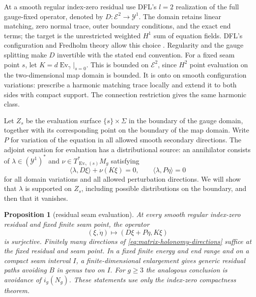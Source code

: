 \documentclass[11pt]{amsart}
\newtheorem{proposition}[theorem]{Proposition}
\theoremstyle{definition}
\theoremstyle{remark}
\theoremstyle{plain}
\newcommand{\Ev}{\operatorname{Ev}}
\begin{document}
At a smooth regular index-zero residual use DFL's $l=2$ realization
of the full gauge-fixed operator, denoted by
$D:\mathcal E^2\to\mathcal Y^1$. The domain retains linear
matching, zero normal trace, outer boundary conditions, and the
exact end terms; the target is the unrestricted weighted $H^1$
sum of equation fields. DFL's configuration and Fredholm theory
allow this choice \cite[Definition~3.9 and Proposition~3.10]
{DaeFukLip21a}. Regularity and the gauge splitting make $D$
invertible with the stated end convention. For a fixed seam point
$s$, let $K=d\Ev_\gamma|_{\dot s=0}$. This is bounded on
$\mathcal E^2$, since $H^2$ point evaluation on the
two-dimensional map domain is bounded. It is onto on smooth
configuration variations: prescribe a harmonic matching trace
locally and extend it to both sides with compact support.
The connection restriction gives the same harmonic class.

Let $Z_s$ be the evaluation surface $\{s\}\times\Sigma$ in
the boundary of the gauge domain, together with its corresponding
point on the boundary of the map domain. Write $P$ for variation
of the equation in all allowed smooth secondary directions.
The adjoint equation for evaluation has a distributional source:
an annihilator consists of $\lambda\in(\mathcal Y^1)^*$ and
$\nu\in T^*_{\Ev_\gamma(s)}M_g$ satisfying
\begin{equation}\label{eq:adjoint-evaluation-source}
 \langle\lambda,D\xi\rangle+\nu(K\xi)=0,
 \qquad \langle\lambda,P\dot\eta\rangle=0
\end{equation}
for all domain variations and all allowed perturbation directions.
We will show that $\lambda$ is supported on $Z_s$, including
possible distributions on the boundary, and then that it vanishes.

\begin{proposition}[residual seam evaluation]
\label{lem:seam-evaluation}
At every smooth regular index-zero residual and fixed finite seam
point, the operator
\begin{equation}\label{eq:augmented-evaluation-linearization}
 (\xi,\dot\eta)\longmapsto(D\xi+P\dot\eta,K\xi)
\end{equation}
is surjective. Finitely many directions of
\eqref{eq:matrix-holonomy-directions} suffice at the fixed residual
and seam point. In a fixed finite energy and end range and on a
compact seam interval $I$, a finite-dimensional enlargement gives
generic residual paths avoiding $B$ in genus two on $I$.
For $g\geq3$ the analogous conclusion is avoidance of $i_g(N_g)$.
These statements use only the index-zero compactness theorem.
\end{proposition}
\end{document}
